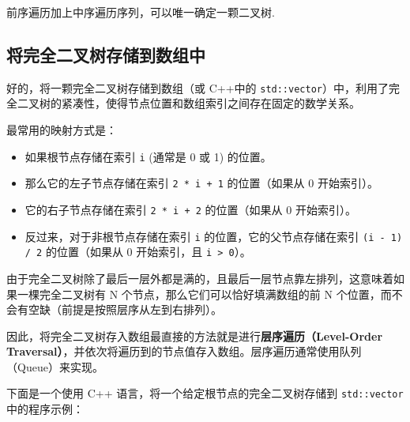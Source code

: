 \begin{note}
前序遍历加上中序遍历序列，可以唯一确定一颗二叉树.
\end{note}
\subsection{将完全二叉树存储到数组中}

好的，将一颗完全二叉树存储到数组（或 C++中的 \lstinline{std::vector}）中，利用了完全二叉树的紧凑性，使得节点位置和数组索引之间存在固定的数学关系。

最常用的映射方式是：

\begin{itemize}
	\item 如果根节点存储在索引 \lstinline{i} (通常是 0 或 1) 的位置。
	\item 那么它的左子节点存储在索引 \lstinline{2 * i + 1} 的位置（如果从 0 开始索引）。
	\item 它的右子节点存储在索引 \lstinline{2 * i + 2} 的位置（如果从 0 开始索引）。
	\item 反过来，对于非根节点存储在索引 \lstinline{i} 的位置，它的父节点存储在索引 \lstinline{(i - 1) / 2} 的位置（如果从 0 开始索引，且 \lstinline{i > 0}）。
\end{itemize}

由于完全二叉树除了最后一层外都是满的，且最后一层节点靠左排列，这意味着如果一棵完全二叉树有 N 个节点，那么它们可以恰好填满数组的前 N 个位置，而不会有空缺（前提是按照层序从左到右排列）。

因此，将完全二叉树存入数组最直接的方法就是进行\textbf{层序遍历（Level-Order Traversal）}，并依次将遍历到的节点值存入数组。层序遍历通常使用队列（Queue）来实现。

下面是一个使用 C++ 语言，将一个给定根节点的完全二叉树存储到 \lstinline{std::vector} 中的程序示例：

